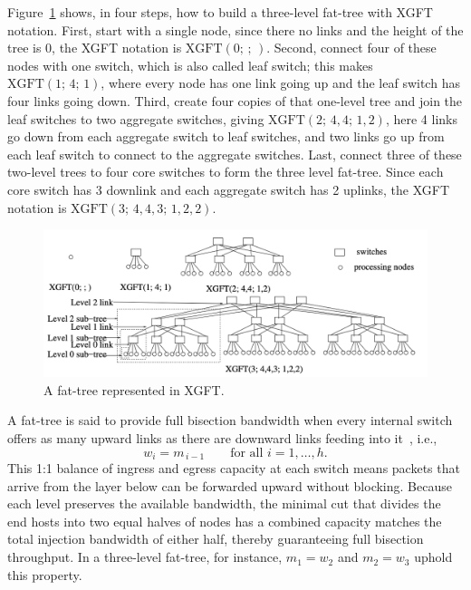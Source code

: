 Figure~\ref{fig:fat-treexgft} shows, in four steps, how to build a three-level fat-tree with XGFT notation.  
First, start with a single node, since there no links and the height of the tree is 0, the XGFT notation is $\mathrm{XGFT}(0;\,;\,)$.  
Second, connect four of these nodes with one switch, which is also called leaf switch; this makes
$\mathrm{XGFT}(1;\,4;\,1)$, where every node has one link going up and the leaf switch has four links going down.  
Third, create four copies of that one-level tree and join the leaf switches to two aggregate switches, giving
$\mathrm{XGFT}(2;\,4,4;\,1,2)$, here 4 links go down from each aggregate switch to leaf switches, and two links go up from 
each leaf switch to connect to the aggregate switches.  
Last, connect three of these two-level trees to four core switches to form the three level fat-tree. Since each core switch has 3 downlink and each aggregate switch has 2 uplinks, the XGFT notation is $\mathrm{XGFT}(3;\,4,4,3;\,1,2,2)$. 
\begin{figure}[h!]
  \centering
  \includegraphics[width=0.8\columnwidth]{./figs/xgft.png}
  \caption{A fat-tree represented in XGFT.}
  \label{fig:fat-treexgft}
\end{figure}

A fat-tree is said to provide full bisection bandwidth when every internal switch offers as many upward links as there are downward links feeding into it~\cite{priceinfiniband}, i.e.,
\[
  w_{i}=m_{\,i-1}\qquad\text{for all }i=1,\dots ,h .
\]
This 1:1 balance of ingress and egress capacity at each switch means packets that arrive from the layer below can be forwarded upward without blocking.  Because each level preserves the available bandwidth, the minimal cut that divides the end hosts into two equal halves of nodes has a combined capacity matches the total injection bandwidth of either half, thereby guaranteeing full bisection throughput.  In a three-level fat-tree, for instance, \(m_{1}=w_{2}\) and \(m_{2}=w_{3}\) uphold this property.

